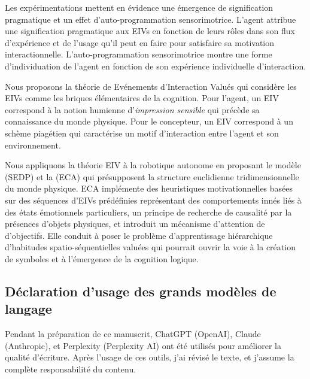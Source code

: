Les expérimentations mettent en évidence une émergence de signification pragmatique et un effet d'auto-programmation sensorimotrice. 
L'agent attribue une signification pragmatique aux EIVs en fonction de leurs rôles dans son flux d'expérience et de l'usage qu'il peut en faire pour satisfaire sa motivation interactionnelle.
L'auto-programmation sensorimotrice montre une forme d'individuation de l'agent en fonction de son expérience individuelle d'interaction. 

Nous proposons la théorie de Evénements d'Interaction Valués qui considère les EIVs comme les briques élémentaires de la cognition. 
Pour l'agent, un EIV correspond à la notion humienne d'\emph{impression sensible} qui précède sa connaissance du monde physique. 
Pour le concepteur, un EIV correspond à un schème piagétien qui caractérise un motif d'interaction entre l'agent et son environnement.

Nous appliquons la théorie EIV à la robotique autonome en proposant le modèle  (SEDP) 
et la  (ECA) qui présupposent la structure euclidienne tridimensionnelle du monde physique.
ECA implémente des heuristiques motivationnelles basées sur des séquences d'EIVs prédéfinies représentant des comportements innés liés à des états émotionnels particuliers, un principe de recherche de causalité par la présences d'objets physiques, et  introduit un mécanisme d'attention de d'objectifs. 
Elle conduit à poser le problème d'apprentissage hiérarchique d'habitudes spatio-séquentielles valuées qui pourrait ouvrir la voie à la création de symboles et à l'émergence de la cognition logique. 



\subsection*{Déclaration d'usage des grands modèles de langage}

\noindent
Pendant la préparation de ce manuscrit, ChatGPT (OpenAI), Claude (Anthropic), et Perplexity (Perplexity AI) ont été utilisés pour améliorer la qualité d'écriture. %
Après l'usage de ces outils, j'ai révisé le texte, et j'assume la complète responsabilité du contenu. 

